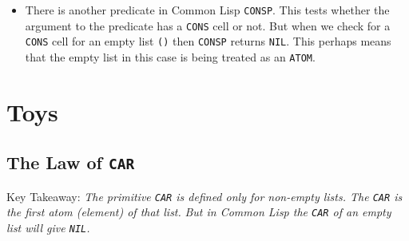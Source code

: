 \documentclass[11pt]{article}
\begin{document}
\begin{itemize}
\begin{verbatim}
(atom '())
» T
\end{verbatim}

We define our own predicate \texttt{ATOMP}

\begin{verbatim}
(defun atom? (x)
  (not (listp x)))
\end{verbatim}

So now \texttt{ATOMP} for our studies of this book will give \texttt{NIL} when tested for an empty list \texttt{'()}

\begin{verbatim}
(atom? '())
» NIL
\end{verbatim}

\item There is another predicate in Common Lisp \texttt{CONSP}. This tests whether the argument to the predicate has a \texttt{CONS}
cell or not. But when we check for a \texttt{CONS} cell for an empty list \texttt{()} then \texttt{CONSP} returns \texttt{NIL}. This perhaps
means that the empty list in this case is being treated as an \texttt{ATOM}.
\end{itemize}



\newpage
\section{Toys}
\label{sec:orgf7fac50}

\subsection{The Law of \texttt{CAR}}
\label{sec:orge8e7878}
Key Takeaway:
\emph{The primitive \texttt{CAR} is defined only for non-empty lists. The \texttt{CAR} is the first atom (element) of that list.}
\emph{But in Common Lisp the \texttt{CAR} of an empty list will give \texttt{NIL}.}

\vspace{1em}
\end{document}
